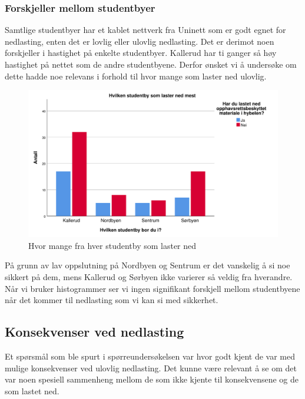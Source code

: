 \subsubsection{Forskjeller mellom studentbyer}
Samtlige studentbyer har et kablet nettverk fra Uninett som er godt egnet for nedlasting, enten det er lovlig eller ulovlig nedlasting. Det er derimot noen forskjeller i hastighet på enkelte studentbyer. Kallerud har ti ganger så høy hastighet på nettet som de andre studentbyene. Derfor ønsket vi å undersøke om dette hadde noe relevans i forhold til hvor mange som laster ned ulovlig. 

\begin{figure}[H]
    \centering
    \includegraphics[scale=0.45]{case_1/bilder/studentby_lasterned.pdf}
    \caption[Studentby laster ned]{Hvor mange fra hver studentby som laster ned}
    \label{fig:case1-studentby_lasterned}
\end{figure}

På grunn av lav oppslutning på Nordbyen og Sentrum er det vanskelig å si noe sikkert på dem, mens Kallerud og Sørbyen ikke varierer så veldig fra hverandre. Når vi bruker histogrammer ser vi ingen signifikant forskjell mellom studentbyene når det kommer til nedlasting som vi kan si med sikkerhet.


\subsection{Konsekvenser ved nedlasting}
Et spørsmål som ble spurt i spørreundersøkelsen var hvor godt kjent de var med mulige konsekvenser ved ulovlig nedlasting. Det kunne være relevant å se om det var noen spesiell sammenheng mellom de som ikke kjente til konsekvensene og de som lastet ned. 

